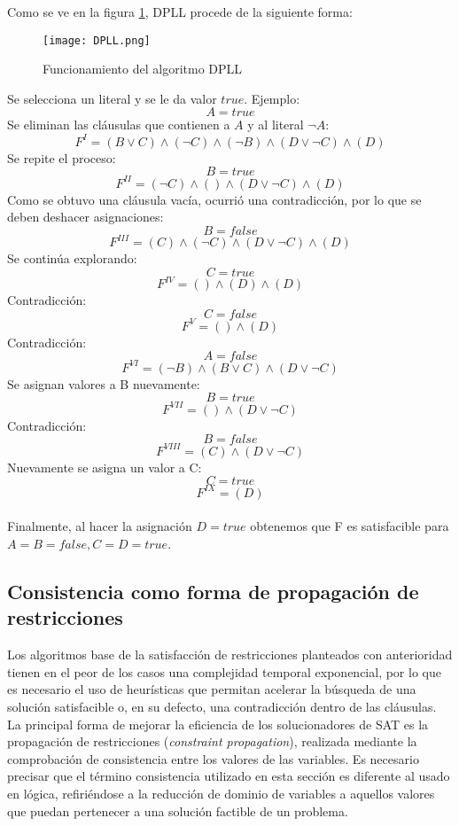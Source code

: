 \documentclass[12pt]{report}
\begin{document}
Como se ve en la figura \ref{fig:DPLL}, DPLL procede de la siguiente forma:

\begin{figure}[ht]
    \centering
    \texttt{[image: DPLL.png]}
    \caption{Funcionamiento del algoritmo DPLL}
    \label{fig:DPLL}
\end{figure}

Se selecciona un literal y se le da valor $true$. Ejemplo:
$$A=true$$
Se eliminan las cláusulas que contienen a $A$ y al literal $\neg A$:
$$F^I=(B\lor C)\land(\neg C)\land(\neg B)\land(D\lor \neg C)\land(D)$$
Se repite el proceso:
$$B=true$$
$$F^{II}=(\neg C)\land()\land(D\lor \neg C)\land(D)$$
Como se obtuvo una cláusula vacía, ocurrió una contradicción, por lo que se deben deshacer asignaciones:
$$B=false$$
$$F^{III}=(C)\land(\neg C)\land(D\lor \neg C)\land(D)$$
Se continúa explorando:
$$C=true$$
$$F^{IV}=()\land(D)\land(D)$$
Contradicción:
$$C=false$$
$$F^{V}=()\land(D)$$
Contradicción:
$$A=false$$
$$F^{VI}=(\neg B)\land(B\lor C)\land(D\lor \neg C)$$
Se asignan valores a B nuevamente:
$$B=true$$
$$F^{VII}=()\land(D\lor \neg C)$$
Contradicción:
$$B=false$$
$$F^{VIII}=(C)\land(D\lor \neg C)$$
Nuevamente se asigna un valor a C:
$$C=true$$
$$F^{IX}=(D)$$\\

Finalmente, al hacer la asignación $D=true$ obtenemos que F es satisfacible para $A=B=false, C=D=true$.

\subsection{Consistencia como forma de propagación de restricciones}

Los algoritmos base de la satisfacción de restricciones planteados con anterioridad tienen en el peor de los casos una complejidad temporal exponencial, por lo que es necesario el uso de heurísticas que permitan acelerar la búsqueda de una solución satisfacible o, en su defecto, una contradicción dentro de las cláusulas.\\

La principal forma de mejorar la eficiencia de los solucionadores de SAT es la propagación de restricciones (\textit{constraint propagation}), realizada mediante la comprobación de consistencia entre los valores de las variables. Es necesario precisar que el término consistencia utilizado en esta sección es diferente al usado en lógica, refiriéndose a la reducción de dominio de variables a aquellos valores que puedan pertenecer a una solución factible de un problema.\\
\end{document}

